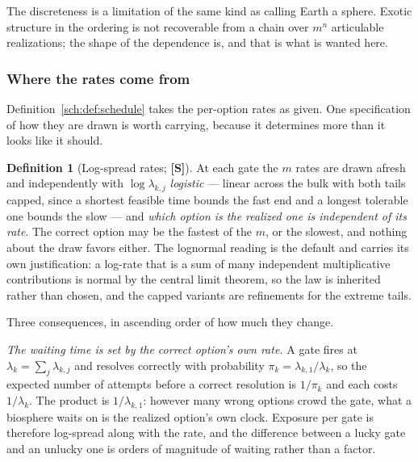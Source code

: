 \documentclass[11pt]{article}
\numberwithin{equation}{section}
\theoremstyle{plain}
\theoremstyle{definition}
\newtheorem{definition}[theorem]{Definition}
\theoremstyle{remark}
\begin{document}
The discreteness is a limitation of the same kind as calling Earth a
sphere. Exotic structure in the ordering is not recoverable from a chain
over $m^n$ articulable realizations; the shape of the dependence is, and
that is what is wanted here.

\subsubsection{Where the rates come from}\label{sch:subsub:rates}

Definition~\ref{sch:def:schedule} takes the per-option rates as given.
One specification of how they are drawn is worth carrying, because it
determines more than it looks like it should.

\begin{definition}[Log-spread rates; \textbf{[S]}]\label{sch:def:rates}
At each gate the $m$ rates are drawn afresh and independently with
$\log\lambda_{k,j}$ \emph{logistic} --- linear across the bulk with both
tails capped, since a shortest feasible time bounds the fast end and a
longest tolerable one bounds the slow --- and \emph{which option is the realized one is
independent of its rate}. The correct option may be the fastest of the
$m$, or the slowest, and nothing about the draw favors either. The
lognormal reading is the default and carries its own justification: a
log-rate that is a sum of many independent multiplicative contributions
is normal by the central limit theorem, so the law is inherited rather
than chosen, and the capped variants are refinements for the extreme
tails.
\end{definition}

Three consequences, in ascending order of how much they change.

\emph{The waiting time is set by the correct option's own rate.} A gate
fires at $\lambda_k=\sum_j\lambda_{k,j}$ and resolves correctly with
probability $\pi_k=\lambda_{k,1}/\lambda_k$, so the expected number of
attempts before a correct resolution is $1/\pi_k$ and each costs
$1/\lambda_k$. The product is $1/\lambda_{k,1}$: however many wrong
options crowd the gate, what a biosphere waits on is the realized
option's own clock. Exposure per gate is therefore log-spread along with
the rate, and the difference between a lucky gate and an unlucky one is
orders of magnitude of waiting rather than a factor.
\end{document}

